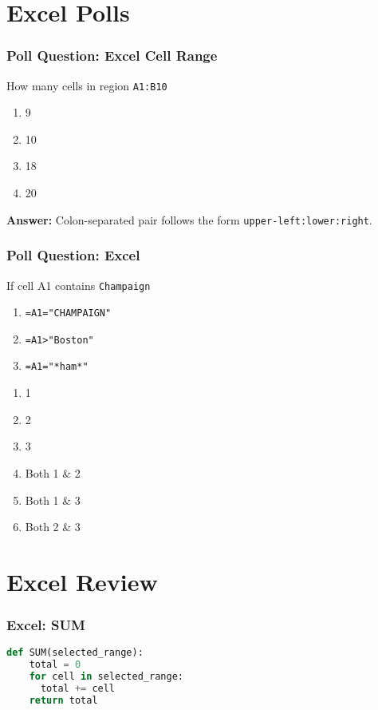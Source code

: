 \documentclass{beamer}
\begin{document}
\section{Excel Polls}
%
%
\begin{frame}[fragile]
  \frametitle{Poll Question: Excel Cell Range}
  How many cells in region \lstinline|A1:B10|
  \vfill
  \begin{enumerate}[A]
    \item 9
    \item 10
    \item 18
    \item 20
  \end{enumerate}
  \pause
  \textbf{Answer: } Colon-separated pair follows the form \lstinline|upper-left:lower:right|.
\end{frame}


%
%
\begin{frame}[fragile]
  \frametitle{Poll Question: Excel}
  If cell A1 contains \lstinline|Champaign|\\
  \begin{enumerate}
    \item \lstinline|=A1="CHAMPAIGN"|
    \item \lstinline|=A1>"Boston"|
    \item \lstinline|=A1="*ham*"|
  \end{enumerate}
  \vfill
  \begin{enumerate}[A]
    \item 1
    \item 2
    \item 3
    \item Both 1 \& 2
    \item Both 1 \& 3
    \item Both 2 \& 3
  \end{enumerate}
\end{frame}

\section{Excel Review}
%
%
\begin{frame}[fragile]
  \frametitle{Excel: SUM}
  \begin{lstlisting}[language=Python, autogobble]
  def SUM(selected_range):
    total = 0
    for cell in selected_range:
      total += cell
    return total
  \end{lstlisting}
\end{frame}
\end{document}
